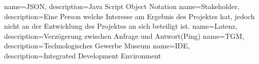 \makeglossaries
{} {name=JSON, description={Java Script Object Notation}}
 {name=Stakeholder, description={Eine Person welche Interesse am Ergebnis des Projektes hat, jedoch nicht an der Entwicklung des Projektes an sich beteiligt ist.}}
 {name=Latenz, description={Verzögerung zwischen Anfrage und Antwort(Ping)}}
 {name=TGM, description={Technologisches Gewerbe Museum}}
 {name=IDE, description={Integrated Development Environment}}

\renewcommand*\glspostdescription{\dotfill}

